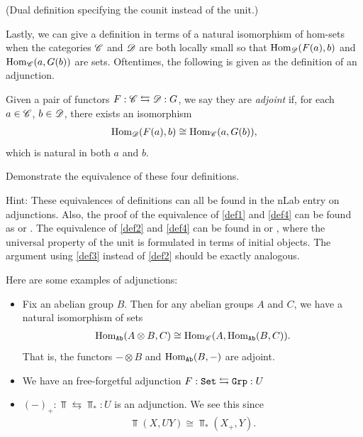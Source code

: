 \documentclass{article}[11pt]
\begin{document}
\begin{definition}\label{def3}
(Dual definition specifying the counit instead of the unit.)
\end{definition} 

Lastly, we can give a definition in terms of a natural isomorphism of hom-sets when the categories $\mathscr{C}$ and $\mathscr{D}$ are both locally small so that $\textup{Hom}_{\mathscr{D}}(F(a),b)$ and $\textup{Hom}_{\mathscr{C}}(a,G(b))$ are sets. Oftentimes, the following is given as the definition of an adjunction.

\begin{definition}\label{def4} Given a pair of functors $F: \mathscr{C} \leftrightarrows \mathscr{D}:G$, we say they are \textit{adjoint} if, for each $a\in \mathscr{C}$, $b\in\mathscr{D}$, there exists an isomorphism
\begin{align*}
	\textup{Hom}_{\mathscr{D}}(F(a), b) \cong \textup{Hom}_{\mathscr{C}} (a, G(b)),
\end{align*}
which is natural in both $a$ and $b$.
\end{definition}

\begin{exercise} Demonstrate the equivalence of these four definitions. 
\end{exercise}

Hint: These equivalences of definitions can all be found in the nLab entry on adjunctions. Also, the proof of the equivalence of \autoref{def1} and \autoref{def4} can be found as  \cite[Theorem 2.2.5]{leinster} or \cite[Theorem 3.9]{mehrle}. The equivalence of \autoref{def2} and \autoref{def4} can be found in \cite[Section 3]{henderson} or \cite[Theorem 2.3.6.]{leinster}, where the universal property of the unit is formulated in terms of initial objects. The argument using \autoref{def3} instead of \autoref{def2} should be exactly analogous.



\begin{examples}\label{exs:adjunctions} Here are some examples of adjunctions:
\begin{itemize}
	\item Fix an abelian group $B$. Then for any abelian groups $A$ and $C$, we have a natural isomorphism of sets
\begin{align*}
	\textup{Hom}_{\texttt{Ab}} (A\otimes B, C) \cong \textup{Hom}_{\mathscr{C}}(A, \textup{Hom}_{\texttt{Ab}} (B,C)).
\end{align*}
That is, the functors $-\otimes B$ and $\textup{Hom}_{\texttt{Ab}} (B, -)$ are adjoint.
	\item We have an free-forgetful adjunction $F: \texttt{Set} \leftrightarrows \texttt{Grp} : U$
	\item $(-)_+ : \Top \leftrightarrows \Top_\ast: U$ is an adjunction. We see this since
	\begin{align*}
		\Top(X,UY) \cong \Top_\ast (X_+, Y).
	\end{align*}
\end{itemize}
\end{examples}
\end{document}
